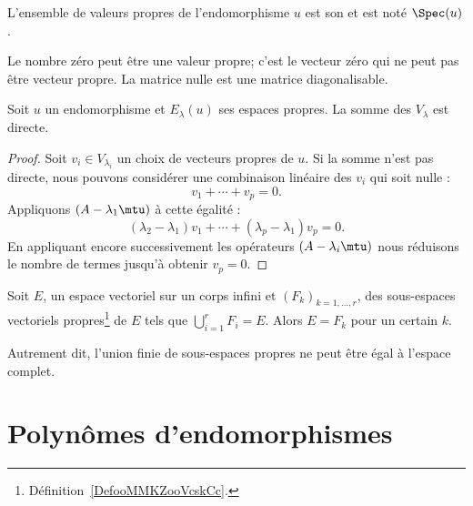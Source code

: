 \begin{definition}
    L'ensemble de valeurs propres de l'endomorphisme \( u\) est son  et est noté \( \Spec(u)\).
\end{definition}

\begin{remark}
    Le nombre zéro peut être une valeur propre; c'est le vecteur zéro qui ne peut pas être vecteur propre. La matrice nulle est une matrice diagonalisable.
\end{remark}

\begin{lemma}       \label{LemjcztYH}
    Soit \( u\) un endomorphisme et \( E_{\lambda}(u)\) ses espaces propres. La somme des \( V_{\lambda}\) est directe.
\end{lemma}

\begin{proof}
    Soit \( v_i\in V_{\lambda_i}\) un choix de vecteurs propres de \( u\). Si la somme n'est pas directe, nous pouvons considérer une combinaison linéaire des \( v_i\) qui soit nulle :
    \begin{equation}
        v_1+\cdots+v_p=0.
    \end{equation}
    Appliquons \( (A-\lambda_1\mtu)\) à cette égalité :
    \begin{equation}
        (\lambda_2-\lambda_1)v_1+\cdots+(\lambda_p-\lambda_1)v_p=0.
    \end{equation}
    En appliquant encore successivement les opérateurs \( (A-\lambda_i\mtu)\) nous réduisons le nombre de termes jusqu'à obtenir \( v_p=0\).
\end{proof}

\begin{proposition}   \label{PropTVKbxU}
    Soit \( E\), un espace vectoriel sur un corps infini et \( (F_k)_{k=1,\ldots, r}\), des sous-espaces vectoriels propres\footnote{Définition~\ref{DefooMMKZooVcskCc}.} de \( E\) tels que \( \bigcup_{i=1}^rF_i=E\). Alors \( E=F_k\) pour un certain \( k\).

    Autrement dit, l'union finie de sous-espaces propres ne peut être égal à l'espace complet.
\end{proposition}

\section{Polynômes d'endomorphismes}
\label{SECooUEQVooLBrRiE}

